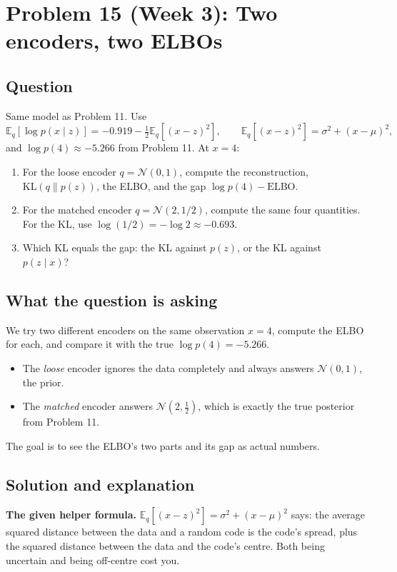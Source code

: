 \documentclass[12pt,a4paper]{article}
\begin{document}
\section{Problem 15 (Week 3): Two encoders, two ELBOs}

\subsection{Question}

Same model as Problem 11. Use
\[
\mathbb{E}_q[\log p(x \mid z)] = -0.919 - \tfrac{1}{2}\mathbb{E}_q[(x - z)^2], \qquad \mathbb{E}_q[(x - z)^2] = \sigma^2 + (x - \mu)^2,
\]
and $\log p(4) \approx -5.266$ from Problem 11. At $x = 4$:

\begin{enumerate}[leftmargin=*]
\item For the loose encoder $q = \mathcal{N}(0, 1)$, compute the reconstruction, $\mathrm{KL}(q\|p(z))$, the ELBO, and the gap $\log p(4) - \text{ELBO}$.
\item For the matched encoder $q = \mathcal{N}(2, 1/2)$, compute the same four quantities. For the KL, use $\log(1/2) = -\log 2 \approx -0.693$.
\item Which KL equals the gap: the KL against $p(z)$, or the KL against $p(z \mid x)$?
\end{enumerate}

\subsection{What the question is asking}

We try two different encoders on the same observation $x = 4$, compute the ELBO for each, and compare it with the true $\log p(4) = -5.266$.
\begin{itemize}[leftmargin=*]
\item The \emph{loose} encoder ignores the data completely and always answers $\mathcal{N}(0,1)$, the prior.
\item The \emph{matched} encoder answers $\mathcal{N}(2, \tfrac12)$, which is exactly the true posterior from Problem 11.
\end{itemize}
The goal is to see the ELBO's two parts and its gap as actual numbers.

\subsection{Solution and explanation}

\textbf{The given helper formula.} $\mathbb{E}_q[(x - z)^2] = \sigma^2 + (x - \mu)^2$ says: the average squared distance between the data and a random code is the code's spread, plus the squared distance between the data and the code's centre. Both being uncertain and being off-centre cost you.
\end{document}

